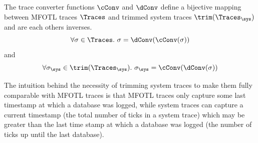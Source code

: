 \begin{theorem}
    \label{theo:trace-equivalence}
    The trace converter functions $\cConv$ and $\dConv$ define a
    bijective mapping between MFOTL traces $\Traces$ and
    trimmed system traces $\trim(\Traces_\sys)$
    and are each others inverses.
    \begin{equation*}
        \forall \sigma \in \Traces .~
        \sigma = \dConv(\cConv(\sigma))
    \end{equation*}
    and
    \begin{equation*}
        \forall \sigma_\sys \in \trim(\Traces_\sys) .~
        \sigma_\sys = \cConv(\dConv(\sigma))
    \end{equation*}
\end{theorem}

The intuition behind the necessity of trimming system traces to make
them fully comparable with MFOTL traces is that MFOTL traces only capture
some last timestamp at which a database was logged, while system traces
can capture a current timestamp (the total number of ticks in a system trace)
which may be greater than the last time stamp at which a database was logged
(the number of ticks up until the last database).


